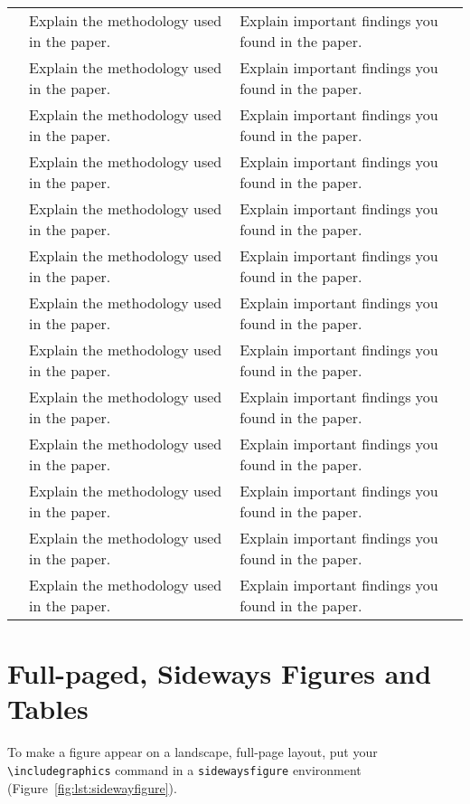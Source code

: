 \begin{singlespace}
\begin{longtable}{m{} m{} m{}}
	\citet{wanna2018fracture} & Explain the methodology used in the paper. & Explain important findings you found in the paper. \\
	\citet{latex:companion} & Explain the methodology used in the paper. & Explain important findings you found in the paper. \\[12pt]
	\citet{othman2019effect} & Explain the methodology used in the paper. & Explain important findings you found in the paper. \\
	\citet{wanna2018fracture} & Explain the methodology used in the paper. & Explain important findings you found in the paper. \\
	\citet{matsom:template} & Explain the methodology used in the paper. & Explain important findings you found in the paper. \\
	\citet{othman2019effect} & Explain the methodology used in the paper. & Explain important findings you found in the paper. \\
	\citet{wanna2018fracture} & Explain the methodology used in the paper. & Explain important findings you found in the paper. \\
	\citet{latex:companion} & Explain the methodology used in the paper. & Explain important findings you found in the paper. \\[12pt]
	\citet{othman2019effect} & Explain the methodology used in the paper. & Explain important findings you found in the paper. \\
	\citet{wanna2018fracture} & Explain the methodology used in the paper. & Explain important findings you found in the paper. \\
	\citet{matsom:template} & Explain the methodology used in the paper. & Explain important findings you found in the paper. \\
	\citet{othman2019effect} & Explain the methodology used in the paper. & Explain important findings you found in the paper. \\
	\citet{wanna2018fracture} & Explain the methodology used in the paper. & Explain important findings you found in the paper. \\
\end{longtable}
\end{singlespace}


\section{Full-paged, Sideways Figures and Tables}

To make a figure appear on a landscape, full-page layout, put your \verb|\includegraphics| command in a \verb|sidewaysfigure| environment (Figure~\ref{fig:lst:sidewayfigure}).

